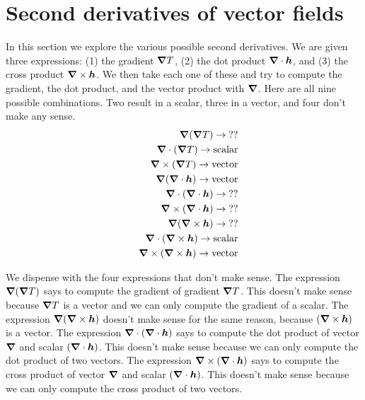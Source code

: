 \section{Second derivatives of vector fields}

In this section we explore the various possible second derivatives.
We are given three expressions:
(1) the gradient $\boldsymbol{\nabla} T$, 
(2) the dot product $\boldsymbol{\nabla} \cdot \boldsymbol{h}$, and 
(3) the cross product $\boldsymbol{\nabla} \times \boldsymbol{h}$.
We then take each one of these and try to compute the gradient,
the dot product, and the vector product with $\boldsymbol{\nabla}$.
Here are all nine possible combinations.
Two result in a scalar, three in a vector, and four don't make any sense.
\begin{eqnarray*}
  && \boldsymbol{\nabla} (\boldsymbol{\nabla} T) \to \mathrm{??} \\
  && \boldsymbol{\nabla} \cdot (\boldsymbol{\nabla} T) \to \mathrm{scalar} \\
  && \boldsymbol{\nabla} \times (\boldsymbol{\nabla} T) \to \mathrm{vector} \\
  && \boldsymbol{\nabla} (\boldsymbol{\nabla} \cdot \boldsymbol{h}) \to \mathrm{vector} \\
  && \boldsymbol{\nabla} \cdot (\boldsymbol{\nabla} \cdot \boldsymbol{h}) \to \mathrm{??} \\
  && \boldsymbol{\nabla} \times (\boldsymbol{\nabla} \cdot \boldsymbol{h}) \to \mathrm{??} \\
  && \boldsymbol{\nabla} (\boldsymbol{\nabla} \times \boldsymbol{h}) \to \mathrm{??} \\
  && \boldsymbol{\nabla} \cdot (\boldsymbol{\nabla} \times \boldsymbol{h}) \to \mathrm{scalar} \\
  && \boldsymbol{\nabla} \times (\boldsymbol{\nabla} \times \boldsymbol{h}) \to \mathrm{vector} \\
\end{eqnarray*}

We dispense with the four expressions that don't make sense.
The expression $\boldsymbol{\nabla} (\boldsymbol{\nabla} T)$ says to compute the gradient of gradient $\boldsymbol{\nabla} T$.
This doesn't make sense because $\boldsymbol{\nabla} T$ is a vector 
and we can only compute the gradient of a scalar.
The expression $\boldsymbol{\nabla} (\boldsymbol{\nabla} \times \boldsymbol{h})$ doesn't make sense for the same reason, 
because $(\boldsymbol{\nabla} \times \boldsymbol{h})$ is a vector.
The expression $\boldsymbol{\nabla} \cdot (\boldsymbol{\nabla} \cdot \boldsymbol{h})$ says to 
compute the dot product of vector $\boldsymbol{\nabla}$ and scalar $(\boldsymbol{\nabla} \cdot \boldsymbol{h})$.
This doesn't make sense because we can only compute the dot product of two vectors.
The expression $\boldsymbol{\nabla} \times (\boldsymbol{\nabla} \cdot \boldsymbol{h})$ says to
compute the cross product of vector $\boldsymbol{\nabla}$ and scalar $(\boldsymbol{\nabla} \cdot \boldsymbol{h})$.
This doesn't make sense because we can only compute the cross product of two vectors.

